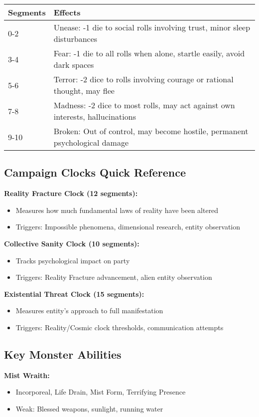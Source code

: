 \documentclass[11pt]{article}
\begin{document}
\begin{tabular}{|p{2cm}|p{10cm}|}
\hline
\textbf{Segments} & \textbf{Effects} \\
\hline
0-2 & Unease: -1 die to social rolls involving trust, minor sleep disturbances \\
3-4 & Fear: -1 die to all rolls when alone, startle easily, avoid dark spaces \\
5-6 & Terror: -2 dice to rolls involving courage or rational thought, may flee \\
7-8 & Madness: -2 dice to most rolls, may act against own interests, hallucinations \\
9-10 & Broken: Out of control, may become hostile, permanent psychological damage \\
\hline
\end{tabular}

\subsection*{Campaign Clocks Quick Reference}

\textbf{Reality Fracture Clock (12 segments):}
\begin{itemize}
\item Measures how much fundamental laws of reality have been altered
\item Triggers: Impossible phenomena, dimensional research, entity observation
\end{itemize}

\textbf{Collective Sanity Clock (10 segments):}
\begin{itemize}
\item Tracks psychological impact on party
\item Triggers: Reality Fracture advancement, alien entity observation
\end{itemize}

\textbf{Existential Threat Clock (15 segments):}
\begin{itemize}
\item Measures entity's approach to full manifestation
\item Triggers: Reality/Cosmic clock thresholds, communication attempts
\end{itemize}

\subsection*{Key Monster Abilities}

\textbf{Mist Wraith:}
\begin{itemize}
\item Incorporeal, Life Drain, Mist Form, Terrifying Presence
\item Weak: Blessed weapons, sunlight, running water
\end{itemize}
\end{document}
